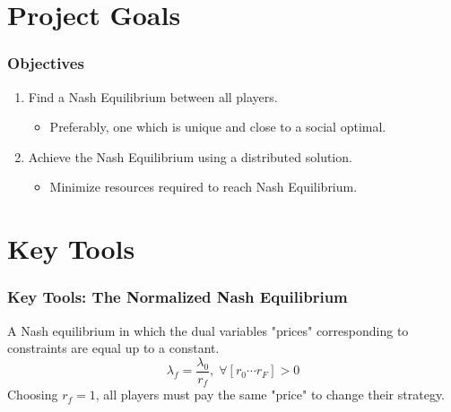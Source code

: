 \documentclass[10pt,tgadventor, onlymath]{beamer}
\begin{document}
\section{Project Goals}

\begin{frame}
\frametitle{Objectives}
\begin{enumerate}
\item Find a Nash Equilibrium between all players.
\begin{itemize}
\item Preferably, one which is unique and close to a social optimal.
\end{itemize}
\item Achieve the Nash Equilibrium using a distributed solution.
\begin{itemize}
\item Minimize resources required to reach Nash Equilibrium.
\end{itemize}
\end{enumerate}
\pause
\begin{center}
\end{center}
\end{frame}

\section{Key Tools}

\begin{frame}
\frametitle{Key Tools: The Normalized Nash Equilibrium}
A Nash equilibrium in which the dual variables "prices" corresponding to constraints are equal up to a constant.
\begin{equation}
\lambda_f = \frac{\lambda_{0}}{ r_f}, \; \forall [r_0 \cdots r_F] > 0 
\end{equation}
Choosing $r_f =1$, all players must pay the same "price" to change their strategy. 
\end{frame}
\end{document}
